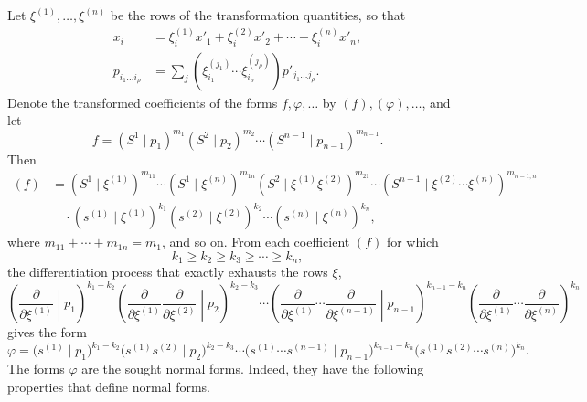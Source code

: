 \documentclass[10pt]{article}
\newcommand{\pair}[2]{(#1\mid #2)}
\begin{document}
Let $\xi^{(1)},\ldots,\xi^{(n)}$ be the rows of the transformation
quantities, so that
\begin{equation}
\begin{aligned}
x_i&=\xi_i^{(1)}x'_1+\xi_i^{(2)}x'_2+\cdots+\xi_i^{(n)}x'_n,\\
p_{i_1\ldots i_\rho}&=\sum_j
(\xi_{i_1}^{(j_1)}\cdots \xi_{i_\rho}^{(j_\rho)})
p'_{j_1\ldots j_\rho}.
\end{aligned}
\tag{47}
\end{equation}
Denote the transformed coefficients of the forms $f,\varphi,\ldots$ by
$(f),(\varphi),\ldots$, and let
\[
 f=\pair{S^1}{p_1}^{m_1}\pair{S^2}{p_2}^{m_2}\cdots
 \pair{S^{n-1}}{p_{n-1}}^{m_{n-1}}.
\]
Then
\begin{equation}
\begin{aligned}
(f)&=\pair{S^1}{\xi^{(1)}}^{m_{11}}\cdots
\pair{S^1}{\xi^{(n)}}^{m_{1n}}
\pair{S^2}{\xi^{(1)}\xi^{(2)}}^{m_{21}}\cdots
\pair{S^{n-1}}{\xi^{(2)}\cdots\xi^{(n)}}^{m_{n-1,n}}\\
&\quad\cdot
\pair{s^{(1)}}{\xi^{(1)}}^{k_1}
\pair{s^{(2)}}{\xi^{(2)}}^{k_2}\cdots
\pair{s^{(n)}}{\xi^{(n)}}^{k_n},
\end{aligned}
\tag{48}
\end{equation}
where $m_{11}+\cdots+m_{1n}=m_1$, and so on. From each coefficient $(f)$
for which
\begin{equation}
 k_1\geq k_2\geq k_3\geq\cdots\geq k_n,
\tag{49}
\end{equation}
the differentiation process that exactly exhausts the rows $\xi$,
\begin{equation}
\left(\frac{\partial}{\partial\xi^{(1)}}\middle|p_1\right)^{k_1-k_2}
\left(\frac{\partial}{\partial\xi^{(1)}}
\frac{\partial}{\partial\xi^{(2)}}\middle|p_2\right)^{k_2-k_3}
\cdots
\left(\frac{\partial}{\partial\xi^{(1)}}\cdots
\frac{\partial}{\partial\xi^{(n-1)}}\middle|p_{n-1}\right)^{k_{n-1}-k_n}
\left(\frac{\partial}{\partial\xi^{(1)}}\cdots
\frac{\partial}{\partial\xi^{(n)}}\right)^{k_n}
\tag{50}
\end{equation}
gives the form
\begin{equation}
 \varphi=\bigl(s^{(1)}\mid p_1\bigr)^{k_1-k_2}
 \bigl(s^{(1)}s^{(2)}\mid p_2\bigr)^{k_2-k_3}\cdots
 \bigl(s^{(1)}\cdots s^{(n-1)}\mid p_{n-1}\bigr)^{k_{n-1}-k_n}
 \bigl(s^{(1)}s^{(2)}\cdots s^{(n)}\bigr)^{k_n}.
\tag{51}
\end{equation}
The forms $\varphi$ are the sought normal forms. Indeed, they have the
following properties that define normal forms.
\end{document}
